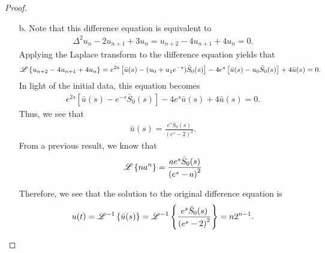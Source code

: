 \begin{proof}
\begin{enumerate}
    \item[b.] Note that this difference equation is equivalent to
      \begin{align*}
        \Delta^2 u_n - 2 u_{n+1} + 3 u_n  = u_{n+2} - 4 u_{n+1} + 4 u_n = 0.
      \end{align*}
      Applying the Laplace transform to the difference equation yields that
      \begin{align*}
        \mathscr{L}\left\{ {u_{n+2} - 4 u_{n+1} + 4 u_n} \right\} = e^{2s}\left[\bar{u}(s)-(u_0 + u_1e^{-s})\bar{S}_0(s)\right] - 4e^s\left[\bar{u}(s)-u_0 \bar{S}_0(s)\right] + 4\bar{u}(s) = 0.
      \end{align*}
      In light of the initial data, this equation becomes
      \begin{align*}
        e^{2s}\left[\bar{u}(s)-e^{-s}\bar{S}_0(s)\right] - 4e^s\bar{u}(s) + 4\bar{u}(s) = 0.
      \end{align*}
      Thus, we see that
      \begin{align*}
        \bar{u}(s) = \frac{e^{s}\bar{S}_0(s)}{\left(e^s-2\right)^2}.
      \end{align*}
      From a previous result, we know that
      \begin{align*}
        \mathscr{L}\left\{ {n a^n} \right\} = \frac{ae^{s}\bar{S}_0(s)}{\left(e^s-a\right)^2}
      \end{align*}

      Therefore, we see that the solution to the original
      difference equation is
      \begin{align*}
        u(t) = \mathscr{L}^{-1}\left\{ {\bar{u}(s)} \right\} = \mathscr{L}^{-1}\left\{ {\frac{e^{s}\bar{S}_0(s)}{\left(e^s-2\right)^2}} \right\} = n 2^{n-1}.
      \end{align*}
  \end{enumerate}

\end{proof}
\newpage

